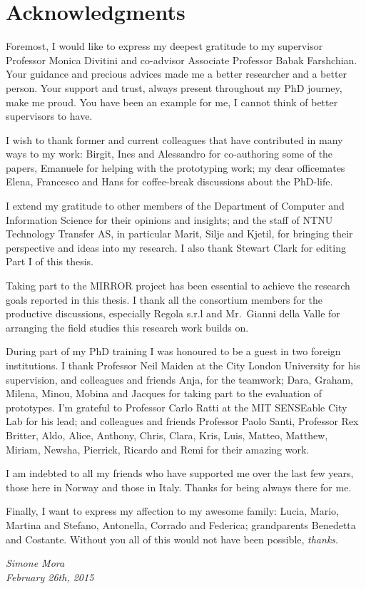\chapter{Acknowledgments}
\enlargethispage{\baselineskip}

Foremost, I would like to express my deepest gratitude to my supervisor Professor Monica Divitini and co-advisor Associate Professor Babak Farshchian. Your guidance and precious advices made me a better researcher and a better person. Your support and trust, always present throughout my PhD journey, make me proud. You have been an example for me, I cannot think of better supervisors to have.

I wish to thank former and current colleagues that have contributed in many ways to my work: Birgit, Ines and Alessandro for co-authoring some of the papers, Emanuele for helping with the prototyping work; my dear officemates Elena, Francesco and Hans for coffee-break discussions about the PhD-life. 

I extend my gratitude to other members of the Department of Computer and Information Science for their opinions and insights; and the staff of NTNU Technology Transfer AS, in particular Marit, Silje and Kjetil, for bringing their perspective and ideas into my research. I also thank Stewart Clark for editing Part I of this thesis.

Taking part to the MIRROR project has been essential to achieve the research goals reported in this thesis. I thank all the consortium members for the productive discussions, especially Regola s.r.l and Mr.\ Gianni della Valle for arranging the field studies this research work builds on.

During part of my PhD training I was honoured to be a guest in two foreign institutions. I thank Professor Neil Maiden at the City London University for his supervision, and colleagues and friends Anja, for the teamwork; Dara, Graham, Milena, Minou, Mobina and Jacques for taking part to the evaluation of prototypes. I'm grateful to Professor Carlo Ratti at the MIT SENSEable City Lab for his lead; and colleagues and friends Professor Paolo Santi, Professor Rex Britter, Aldo, Alice, Anthony, Chris, Clara, Kris, Luis, Matteo, Matthew, Miriam, Newsha, Pierrick, Ricardo and Remi for their amazing work.    

I am indebted to all my friends who have supported me over the last few years, those here in Norway and those in Italy. Thanks for being always there for me.

Finally, I want to express my affection to my awesome family: Lucia, Mario, Martina and Stefano, Antonella, Corrado and Federica; grandparents Benedetta and Costante. Without you all of this would not have been possible, \emph{thanks}.

\begin{flushright}
\emph{\small Simone Mora}\\\emph{\small February 26th, 2015}	
\end{flushright}


